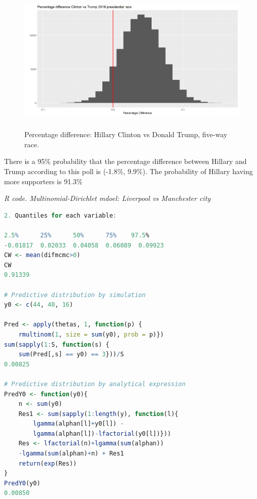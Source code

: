 \begin{enumerate}[leftmargin=*]
\begin{figure}[!h]
	\includegraphics[width=340pt, height=200pt]{Chapters/chapter4/figures/hiillaryVStrump.png}
	\caption[List of figure caption goes here]{Percentage difference: Hillary Clinton vs Donald Trump, five-way race.}\label{fig41}
\end{figure}

There is a 95\% probability that the percentage difference between Hillary and Trump according to this poll is (-1.8\%, 9.9\%). The probability of Hillary having more supporters is 91.3\%


\begin{tcolorbox}[enhanced,width=4.67in,center upper,
	fontupper=\large\bfseries,drop shadow southwest,sharp corners]
	\textit{R code. Multinomial-Dirichlet mdoel: Liverpool vs Manchester city}
\begin{VF}
\begin{lstlisting}[basicstyle=\footnotesize, language=R]
2. Quantiles for each variable:

2.5%      25%      50%      75%    97.5% 
-0.01817  0.02033  0.04058  0.06089  0.09923 
CW <- mean(difmcmc>0)
CW
0.91339

# Predictive distribution by simulation
y0 <- c(44, 40, 16)

Pred <- apply(thetas, 1, function(p) {
	rmultinom(1, size = sum(y0), prob = p)})
sum(sapply(1:S, function(s) {
	sum(Pred[,s] == y0) == 3}))/S
0.00825

# Predictive distribution by analytical expression
PredY0 <- function(y0){
	n <- sum(y0)
	Res1 <- sum(sapply(1:length(y), function(l){
		lgamma(alphan[l]+y0[l]) - 
		lgamma(alphan[l])-lfactorial(y0[l])}))
	Res <- lfactorial(n)+lgamma(sum(alphan))
	-lgamma(sum(alphan)+n) + Res1
	return(exp(Res))
}
PredY0(y0)
0.00850         
\end{lstlisting}
\end{VF}
\end{tcolorbox} 


\end{enumerate}
